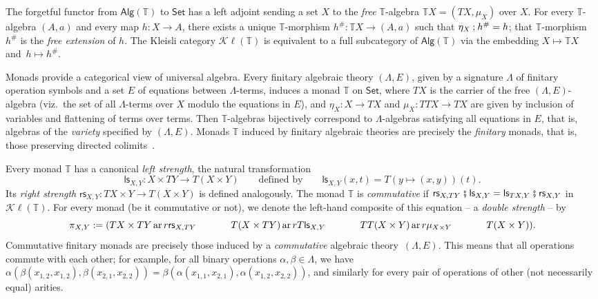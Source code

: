 \documentclass[a4paper, UKenglish, numberwithinsect, thm-restate, cleveref, final]{lipics-v2021}
\theoremstyle{plain}
\theoremstyle{definition}
\newcommand{\T}{\ensuremath{\mathbb{T}}\xspace}
\newcommand{\seq}{\ensuremath{\mathbin{\text{\upshape;}}}}
\newcommand{\lst}{\mathsf{ls}}
\newcommand{\rst}{\mathsf{rs}}
\newcommand{\Kl}{\ensuremath{\mathcal{K}\!\ell}}
\newcommand{\Alg}{\ensuremath{\mathsf{Alg}}}
\newcommand{\Set}{\ensuremath{\mathsf{Set}}\xspace}
\newcommand{\kseq}{\ensuremath{\mathrel{\fatsemi}}}
\DeclareMathOperator{\ar}{ar}
\numberwithin{equation}{section}
\begin{document}
The forgetful functor from $\Alg(\T)$ to $\Set$ has a left adjoint sending a set $X$ to the
\emph{free} $\T$-algebra  $\T X=(TX,\mu_X)$ over $X$. For every $\T$-algebra $(A,a)$ and every map
$h\colon X\to A$, there exists a unique $\T$-morphism $h^\#\colon \T X\to (A,a)$ such that $\eta_X
\seq h^\# = h$; that $\T$-morphism~$h^\#$ is the \emph{free extension} of $h$. The Kleisli category $\Kl(\T)$ is equivalent to a full subcategory of $\Alg(\T)$ via the embedding $X\mapsto \T X$ and~$h\mapsto h^\#$.


Monads provide a categorical view of universal algebra. Every finitary algebraic theory $(\Lambda,E)$,
given by a signature $\Lambda$ of finitary operation symbols and a set $E$ of equations between
$\Lambda$-terms, induces a monad $\T$ on $\Set$, where $T X$ is the carrier of the free
$(\Lambda,E)$-algebra (viz.~the set of all $\Lambda$-terms over $X$ modulo the equations in
$E$), and $\eta_X\colon X\to T X$ and $\mu_X\colon TT X\to TX$ are given by inclusion of
variables and flattening of terms over terms. Then $\T$-algebras bijectively correspond to
$\Lambda$-algebras satisfying all equations in $E$, that is, algebras of the \emph{variety}
specified by $(\Lambda,E)$. 
Monads $\T$ induced by finitary algebraic theories are precisely the \emph{finitary} monads, that is, those preserving directed colimits~\cite{adamek-rosicky-94}.

Every monad $\T$ has a canonical \emph{left strength}, the natural transformation
\[ 
  \lst_{X,Y}\colon X\times TY \to T(X\times Y)
  \qquad\text{defined by}\qquad
  \lst_{X, Y}(x,t) = T(y\! \mapsto\! (x,y))(t).
\]
 Its \emph{right strength} $\rst_{X,Y}\colon TX\times Y\to T(X\times Y)$ is defined analogously. The monad $\T$ is \emph{commutative} if $\rst_{X, TY} \kseq \lst_{X, Y} = \lst_{TX, Y} \kseq \rst_{X, Y}$ in $\Kl(\T)$.
For every monad (be it commutative or not), we denote the left-hand composite  of this equation -- a \emph{double strength} -- by
\begin{equation}\label{eq:pi2}
\pi_{X,Y} :=
(\begin{tikzcd}[cramped,column sep=30]TX\times TY \ar{r}{\rst_{X,TY}} & T(X\times TY) \ar{r}{T\lst_{X,Y}} & TT(X\times Y) \ar{r}{\mu_{X\times Y}} & T(X\times Y)).
\end{tikzcd}
\end{equation}
Commutative finitary monads are precisely those induced by a \emph{commutative} algebraic
theory~$(\Lambda,E)$. This means that all operations commute with each other; for example, for
all binary operations \(\alpha, \beta \in \Lambda\), we have $\alpha(\beta(x_{1,2}, x_{1,2}), \beta(x_{2,1}, x_{2,2}))
  =
  \beta(\alpha(x_{1,1}, x_{2,1}), \alpha(x_{1,2}, x_{2,2}))
$,
 and similarly for every pair of operations of other (not necessarily equal) arities.
\end{document}
